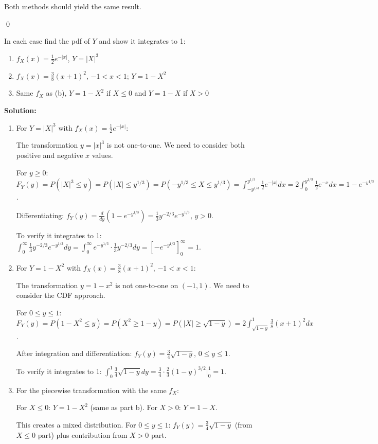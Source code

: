 Both methods should yield the same result.


\qed
\begin{problembox}
In each case find the pdf of $Y$ and show it integrates to 1:
\begin{enumerate}[label=(\alph*)]
    \item $f_X(x) = \frac{1}{2}e^{-|x|}$, $Y=|X|^3$
    \item $f_X(x) = \frac{3}{8}(x+1)^2$, $-1<x<1$; $Y=1-X^2$
    \item Same $f_X$ as (b), $Y=1-X^2$ if $X\leq0$ and $Y=1-X$ if $X>0$
\end{enumerate}
\end{problembox}

\noindent\textbf{Solution:}
\begin{enumerate}[label=(\alph*)]
    \item For $Y = |X|^3$ with $f_X(x) = \frac{1}{2}e^{-|x|}$:
    
    The transformation $y = |x|^3$ is not one-to-one. We need to consider both positive and negative $x$ values.
    
    For $y \geq 0$: $F_Y(y) = P(|X|^3 \leq y) = P(|X| \leq y^{1/3}) = P(-y^{1/3} \leq X \leq y^{1/3}) = \int_{-y^{1/3}}^{y^{1/3}} \frac{1}{2}e^{-|x|}dx = 2\int_0^{y^{1/3}} \frac{1}{2}e^{-x}dx = 1 - e^{-y^{1/3}}$.
    
    Differentiating: $f_Y(y) = \frac{d}{dy}(1 - e^{-y^{1/3}}) = \frac{1}{3}y^{-2/3}e^{-y^{1/3}}$, $y > 0$.
    
    To verify it integrates to 1: $\int_0^\infty \frac{1}{3}y^{-2/3}e^{-y^{1/3}}dy = \int_0^\infty e^{-y^{1/3}} \cdot \frac{1}{3}y^{-2/3}dy = \left[-e^{-y^{1/3}}\right]_0^\infty = 1$.
    
    \item For $Y = 1-X^2$ with $f_X(x) = \frac{3}{8}(x+1)^2$, $-1 < x < 1$:
    
    The transformation $y = 1-x^2$ is not one-to-one on $(-1,1)$. We need to consider the CDF approach.
    
    For $0 \leq y \leq 1$: $F_Y(y) = P(1-X^2 \leq y) = P(X^2 \geq 1-y) = P(|X| \geq \sqrt{1-y}) = 2\int_{\sqrt{1-y}}^1 \frac{3}{8}(x+1)^2dx$.
    
    After integration and differentiation: $f_Y(y) = \frac{3}{4}\sqrt{1-y}$, $0 \leq y \leq 1$.
    
    To verify it integrates to 1: $\int_0^1 \frac{3}{4}\sqrt{1-y}dy = \frac{3}{4} \cdot \frac{2}{3}(1-y)^{3/2}|_0^1 = 1$.
    
    \item For the piecewise transformation with the same $f_X$:
    
    For $X \leq 0$: $Y = 1-X^2$ (same as part b).
    For $X > 0$: $Y = 1-X$.
    
    This creates a mixed distribution. For $0 \leq y \leq 1$: $f_Y(y) = \frac{3}{4}\sqrt{1-y}$ (from $X \leq 0$ part) plus contribution from $X > 0$ part.
\end{enumerate}


